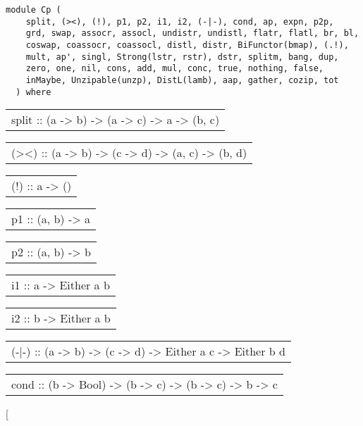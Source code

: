 \label{module:Cp}
\haddockbeginheader
{\haddockverb\begin{verbatim}
module Cp (
    split, (><), (!), p1, p2, i1, i2, (-|-), cond, ap, expn, p2p,
    grd, swap, assocr, assocl, undistr, undistl, flatr, flatl, br, bl,
    coswap, coassocr, coassocl, distl, distr, BiFunctor(bmap), (.!),
    mult, ap', singl, Strong(lstr, rstr), dstr, splitm, bang, dup,
    zero, one, nil, cons, add, mul, conc, true, nothing, false,
    inMaybe, Unzipable(unzp), DistL(lamb), aap, gather, cozip, tot
  ) where\end{verbatim}}
\haddockendheader

\begin{haddockdesc}
\item[\begin{tabular}{@{}l}
split :: (a -> b) -> (a -> c) -> a -> (b, c)
\end{tabular}]
\item[\begin{tabular}{@{}l}
(><) :: (a -> b) -> (c -> d) -> (a, c) -> (b, d)
\end{tabular}]
\item[\begin{tabular}{@{}l}
(!) :: a -> ()
\end{tabular}]
\item[\begin{tabular}{@{}l}
p1 :: (a, b) -> a
\end{tabular}]
\item[\begin{tabular}{@{}l}
p2 :: (a, b) -> b
\end{tabular}]
\item[\begin{tabular}{@{}l}
i1 :: a -> Either a b
\end{tabular}]
\item[\begin{tabular}{@{}l}
i2 :: b -> Either a b
\end{tabular}]
\item[\begin{tabular}{@{}l}
(-|-) :: (a -> b) -> (c -> d) -> Either a c -> Either b d
\end{tabular}]
\item[\begin{tabular}{@{}l}
cond :: (b -> Bool) -> (b -> c) -> (b -> c) -> b -> c
\end{tabular}]
\item[\begin{tabular}{@{}l}

\end{tabular}
\end{haddockdesc}
